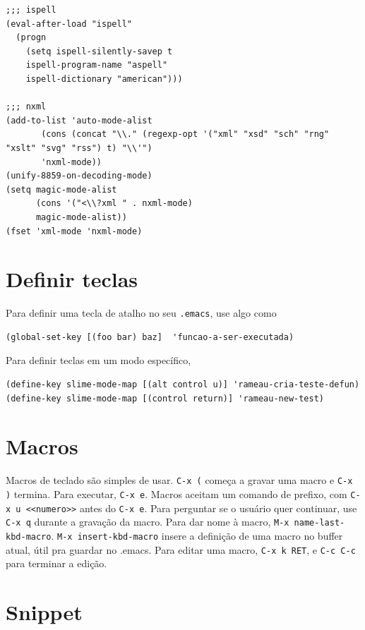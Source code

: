 \documentclass[12pt,brazil]{book}
\begin{document}
\begin{verbatim}
;;; ispell
(eval-after-load "ispell"
  (progn
    (setq ispell-silently-savep t
    ispell-program-name "aspell"
    ispell-dictionary "american")))

;;; nxml
(add-to-list 'auto-mode-alist
       (cons (concat "\\." (regexp-opt '("xml" "xsd" "sch" "rng" "xslt" "svg" "rss") t) "\\'")
       'nxml-mode))
(unify-8859-on-decoding-mode)
(setq magic-mode-alist
      (cons '("<\\?xml " . nxml-mode)
      magic-mode-alist))
(fset 'xml-mode 'nxml-mode)
\end{verbatim}

\section{Definir teclas}
\label{sec:teclas}

Para definir uma tecla de atalho no seu \texttt{.emacs}, use algo como

\begin{verbatim}
(global-set-key [(foo bar) baz]  'funcao-a-ser-executada)
\end{verbatim}

Para definir teclas em um modo específico,

\begin{verbatim}
(define-key slime-mode-map [(alt control u)] 'rameau-cria-teste-defun)
(define-key slime-mode-map [(control return)] 'rameau-new-test)
\end{verbatim}

\section{Macros}
\label{sec:macros}

Macros de teclado são simples de usar. \texttt{C-x (} começa a gravar
uma macro e \texttt{C-x )} termina. Para executar, \texttt{C-x
  e}. Macros aceitam um comando de prefixo, com \texttt{C-x u
  <<numero>>} antes do \texttt{C-x e}. Para perguntar se o usuário
quer continuar, use \texttt{C-x q} durante a gravação da macro. Para
dar nome à macro, \texttt{M-x name-last-kbd-macro}. \texttt{M-x
  insert-kbd-macro} insere a definição de uma macro no buffer atual,
útil pra guardar no .emacs. Para editar uma macro, \texttt{C-x k RET},
e \texttt{C-c C-c} para terminar a edição.

\section{Snippet}
\label{sec:snippet}
\end{document}

